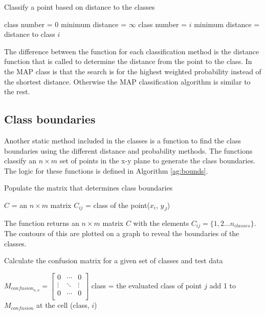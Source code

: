 \begin{algorithm}
\caption{Classify a point based on distance to the classes}
\label{ag:class}
\begin{algorithmic}
\STATE class number = 0
\STATE minimum distance = $\infty$
\STATE class number = $i$
\STATE minimum distance = distance to class $i$
\ENDIF
\ENDFOR
\end{algorithmic}
\end{algorithm}

The difference between the function for each classification method is the
distance function that is called to determine the distance from the point to
the class. In the MAP class is that the search is for the highest weighted
probability instead of the shortest distance. Otherwise the MAP classification algorithm is similar to the rest.

\subsection{Class boundaries}
Another static method included in the classes is a function to find the class
boundaries using the different distance and probability methods. The
functions classify an $n \times m$ set of points in the x-y plane to generate
the class boundaries. The logic for these functions is defined in Algorithm
\ref{ag:bounds}.

\begin{algorithm}
\caption{Populate the matrix that determines class boundaries}
\label{ag:bounds}
\begin{algorithmic}
\STATE $C$ = an $n \times m$ matrix
	$C_{ij}$ = class of the point($x_i$, $y_J$)
	\ENDFOR
\ENDFOR
\end{algorithmic}
\end{algorithm}

The function returns an $n \times m$ matrix $C$ with the elements $C_{ij} =
\{ 1,2 \ldots n_{classes} \}$. The contours of this are plotted on a graph to
reveal the boundaries of the classes.

\begin{algorithm}
\caption{Calculate the confusion matrix for a given set of classes and test
data}
\label{ag:confusion}
\begin{algorithmic}
\STATE $
M_{confusion_{n,n}} =
\begin{bmatrix}
0 & \cdots & 0 \\  
\vdots & \ddots & \vdots \\
0 & \cdots & 0 \\
\end{bmatrix}
$
\STATE class = the evaluated class of point $j$
\STATE add 1 to $M_{confusion}$ at the cell (class, $i$)
\ENDFOR
\ENDFOR
\end{algorithmic}
\end{algorithm}


